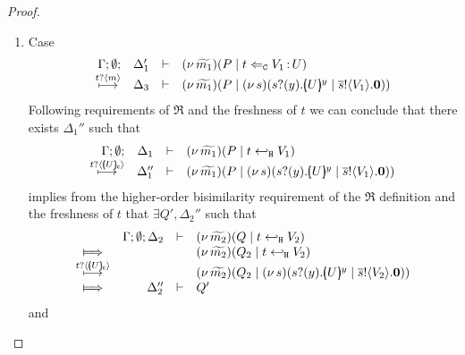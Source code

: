 \begin{proof}
\begin{enumerate}[1.]
\begin{enumerate}
							and $C_1 = C_2 = \inact$ otherwise.
							From \eqref{proof:trig_equiv00} we can conclude that there exists a $ \Delta_4$ such that
						\[
							\horel{\Gamma}{\Delta_2'}{\newsp{\widetilde{m_1}}{Q \Par \ftrigger{t}{V_2}{U}}}
							{\Hby{\ell_2}}
							{\Delta_4}{\newsp{\widetilde{m_2}'}{Q' \Par \ftrigger{t}{V_2}{U}}}
						\]
							Equation \eqref{proof:trig_equiv11} then concludes that
						\[
							\horel{\Gamma}{\Delta_3'}{\newsp{\widetilde{m_1}'''}{P' \Par \ftrigger{t}{V_1}{U} \Par C_1}}
							{\ \Re\ }
							{\Delta_4'}{\newsp{\widetilde{m_2}'''}{Q' \Par \ftrigger{t}{V_2}{U} \Par C_2}}
						\]
							as required.

					\item	Case
						\[
							\begin{array}{rcll} \Gamma; \emptyset; &\Delta_1'& \vdash& (\nu\, \widetilde{m_1})(P \;|\; t \Leftarrow_{\mathtt{C}} V_1{\,:\,}U)\\ \stackrel{t ? \langle m \rangle}{\longmapsto} &\Delta_3& \vdash &  (\nu\, \widetilde{m_1})(P \;|\; (\nu\, s)(s ? (y) . [\!\!(U)\!\!]^{y} \;|\; \overline{s} ! \langle V_1 \rangle . \mathbf{0})) \end{array}
						\]
							Following requirements of $\Re$ and the freshness of $t$
							we can conclude that there exists $\Delta_1''$ such that
						\[
							\mhorel{\Gamma}{\Delta_1}{\newsp{\widetilde{m_1}}{P \Par \htrigger{t}{V_1}}}
							{\hby{\bactinp{t}{\omapchar{U}}}}
							{\Delta_1''}{}{\newsp{\widetilde{m_1}}{P \Par \newsp{s}{\binp{s}{y} \mapchar{U}{y} \Par \bout{\dual{s}}{V_1} \inact}}}
						\]
							implies from the higher-order bisimilarity requirement of the $\Re$ definition and
							the freshness of $t$ that $\exists Q', \Delta_2''$ such that
							\begin{eqnarray}
								\begin{array}{crll}
									& \Gamma; \es; \Delta_2 & \proves &		
									\newsp{\widetilde{m_2}}{Q \Par \htrigger{t}{V_2}}
									\\
									\Hby{} &&&
									\newsp{\widetilde{m_2}}{Q_2 \Par \htrigger{t}{V_2}}
									\\
									{\hby{\bactinp{t}{\omapchar{U}}}} & & &
									\newsp{\widetilde{m_2}}{Q_2 \Par \newsp{s}{\binp{s}{y} \mapchar{U}{y} \Par \bout{\dual{s}}{V_2} \inact}}
									\\
									\Hby{} & \Delta_2'' & \proves & Q'
								\end{array}
								\label{proof:trig_equiv22}
							\end{eqnarray}
							and

\end{enumerate}
\end{enumerate}
\end{proof}
